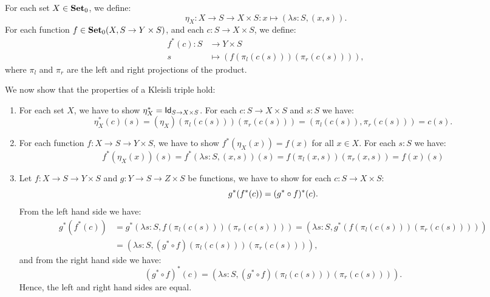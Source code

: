 \begin{solution}
	\label{sol:kleisli_triple_side_effects}
	For each set $X\in\Ob \SET$, we define:
	\[
	\eta_X : X \to S \to X \times S : x\mapsto (\lambda s: S, (x,s)).
	\]
	For each function $f\in\CHom{\Ob \SET}{X}{S \to Y \times S}$, and each $c : S \to X \times S$, we define:
	\begin{align*}
	f^{*} (c) : S & \to Y \times S  \\
	s & \mapsto (f (\pi_l(c(s))) (\pi_r (c(s)))),
	\end{align*}
	where $\pi_l$ and $\pi_r$ are the left and right projections of the product. 
	
	We now show that the properties of a Kleisli triple hold:
	\begin{enumerate}
	\item For each set $X$, we have to show $\eta_X^{*} = \Id[S \to X \times S]$. For each $c : S \to X \times S$ and $s : S$ we have:
	$$\eta^*_X (c) (s)= (\eta_X) (\pi_l (c(s))) (\pi_r (c(s))) = (\pi_l (c(s)), \pi_r (c(s))) = c (s).$$
	
	\item For each function $f:X\to S \to Y \times S$, we have to show $f^{*}(\eta_X(x)) = f(x)$ for all $x \in X$. For each $s : S$ we have: 
	$$ f^* (\eta_X (x)) (s) = f^* (\lambda s: S, (x,s)) (s) = f (\pi_l (x,s)) (\pi_r (x,s)) = f (x)(s) $$
	
	\item Let $f:X\to S \to Y \times S$ and $g:Y\to S \to Z \times S$ be functions, we have to show for each $c : S \to X \times S$:
	\[
	g^{*}(f^{*}(c)) = (\co{f}{g^{*}})^{*}(c).
	\] 
	From the left hand side we have: 
	\begin{align*}
	g^* (f^* (c)) & = g^* (\lambda s : S, f (\pi_l (c(s))) (\pi_r (c(s)))) = (\lambda s : S, g^* (f (\pi_l (c(s))) (\pi_r (c(s))))) \\
	& = (\lambda s : S, (g^* \circ f) (\pi_l (c(s))) (\pi_r (c(s)))),
	\end{align*}
	and from the right hand side we have:
	$$ (g^* \circ f)^* (c) = (\lambda s : S, (g^* \circ f) (\pi_l (c(s))) (\pi_r (c(s)))).$$ 
	Hence, the left and right hand sides are equal. 
	\end{enumerate}
	\end{solution}
	

